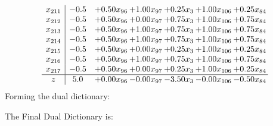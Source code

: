 \documentclass[8pt]{article}
\begin{document}
\[\begin{array}{c| c c@{\hskip 2pt} c@{\hskip 2pt} c@{\hskip 2pt} c@{\hskip 2pt} c@{\hskip 2pt} }
 x_{211}   &  -0.5 & +  0.50 x_{96} & +  1.00 x_{97} & +  0.25 x_{3} & +  1.00 x_{106} & +  0.25 x_{84}\\
 x_{212}   &  -0.5 & +  0.50 x_{96} & +  0.00 x_{97} & +  0.75 x_{3} & +  1.00 x_{106} & +  0.75 x_{84}\\
 x_{213}   &  -0.5 & +  0.50 x_{96} & +  1.00 x_{97} & +  0.75 x_{3} & +  1.00 x_{106} & +  0.75 x_{84}\\
 x_{214}   &  -0.5 & +  0.50 x_{96} & +  1.00 x_{97} & +  0.75 x_{3} & +  1.00 x_{106} & +  0.75 x_{84}\\
 x_{215}   &  -0.5 & +  0.50 x_{96} & +  0.00 x_{97} & +  0.25 x_{3} & +  1.00 x_{106} & +  0.25 x_{84}\\
 x_{216}   &  -0.5 & +  0.50 x_{96} & +  1.00 x_{97} & +  0.75 x_{3} & +  1.00 x_{106} & +  0.75 x_{84}\\
 x_{217}   &  -0.5 & +  0.50 x_{96} & +  0.00 x_{97} & +  0.25 x_{3} & +  1.00 x_{106} & +  0.25 x_{84}\\
\hline
z    &  5.0 & +  0.00 x_{96} & -0.00 x_{97} & -3.50 x_{3} & -0.00 x_{106} & -0.50 x_{84}\\
\end{array}\]
Forming the dual dictionary:

The Final Dual Dictionary is: 
\end{document}
